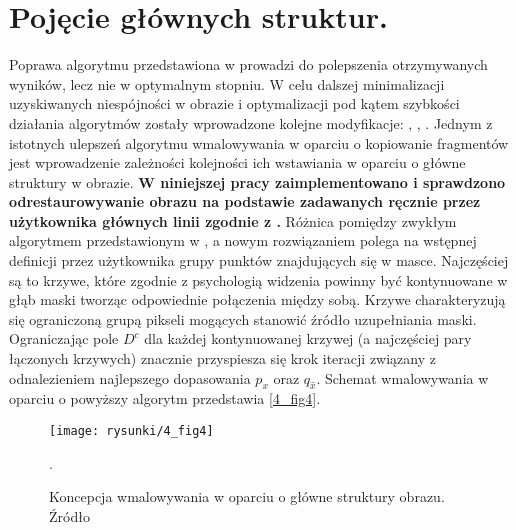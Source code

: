 \documentclass[12pt, twoside, openany]{report}
\theoremstyle{definition}
\begin{document}
\section{Pojęcie głównych struktur.}
Poprawa algorytmu przedstawiona w \cite{criminisi2004region} prowadzi do polepszenia otrzymywanych wyników, lecz nie w optymalnym stopniu. W celu dalszej minimalizacji uzyskiwanych niespójności w obrazie i optymalizacji pod kątem szybkości działania algorytmów zostały wprowadzone kolejne modyfikacje: \cite{StructurePropagationManual},  \cite{malluvalasaimplementation}, \cite{SalientStrucTexProp}. 
Jednym z istotnych ulepszeń algorytmu wmalowywania w oparciu o kopiowanie fragmentów jest wprowadzenie zależności kolejności ich wstawiania w oparciu o główne struktury w obrazie.
\textbf{W niniejszej pracy zaimplementowano i sprawdzono odrestaurowywanie obrazu na podstawie zadawanych ręcznie przez użytkownika głównych linii zgodnie z \cite{StructurePropagationManual}.}
Różnica pomiędzy zwykłym algorytmem przedstawionym w \cite{criminisi2004region}, a nowym rozwiązaniem polega na wstępnej definicji przez użytkownika grupy punktów znajdujących się w masce. Najczęściej są to krzywe, które zgodnie z psychologią widzenia powinny być kontynuowane w głąb maski tworząc odpowiednie połączenia między sobą. Krzywe charakteryzują się ograniczoną grupą pikseli mogących stanowić źródło uzupełniania maski. Ograniczając pole $D^c$ dla każdej kontynuowanej krzywej (a najczęściej pary łączonych krzywych) znacznie przyspiesza się krok iteracji związany z odnalezieniem najlepszego dopasowania $p_x$ oraz $q_{\hat{x}}$. Schemat wmalowywania w oparciu o powyższy algorytm przedstawia \autoref{4_fig4}.
\begin{figure}[!h]
	\centering
	\texttt{[image: rysunki/4\_fig4]}
	\caption{Koncepcja wmalowywania w oparciu o główne struktury obrazu. Źródło \cite{StructurePropagationManual}}.
	\label{4_fig4} 
\end{figure}
\end{document}
